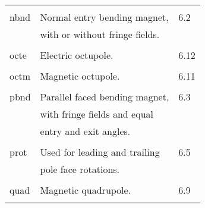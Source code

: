 \begin{center}
\begin{tabular}{lll}
\vspace{-3mm}& &\\
\hspace{1.5em}nbnd    &         Normal entry bending magnet,    &  \hspace{2em}6.2 \\
               &             with or without fringe fields.  &      \\
\vspace{-3mm}& &\\
\hspace{1.5em}octe    &         Electric octupole.                   &  \hspace{2em}6.12\\
\vspace{-3mm}& &\\
\hspace{1.5em}octm    &         Magnetic octupole.                   &  \hspace{2em}6.11\\
\vspace{-3mm}& &\\
\hspace{1.5em}pbnd    &         Parallel faced bending magnet,  &  \hspace{2em}6.3 \\
               &             with fringe fields and equal    &      \\
               &             entry and exit angles.          &      \\
\vspace{-3mm}& &\\
\hspace{1.5em}prot    &         Used for leading and trailing   &  \hspace{2em}6.5 \\
               &             pole face rotations.            &      \\
\vspace{-3mm}& &\\
\hspace{1.5em}quad    &         Magnetic quadrupole.                 &  \hspace{2em}6.9 \\
\vspace{-3mm}& &\\
\end{tabular}


\end{center}

